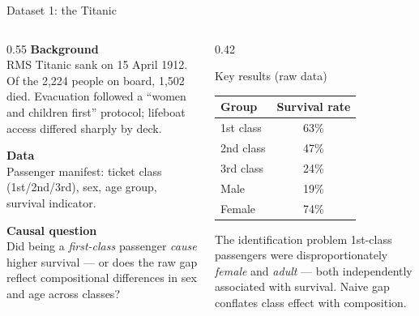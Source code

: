 \documentclass[aspectratio=169, 10pt]{beamer}
\begin{document}
\begin{frame}[shrink=8]{Dataset 1: the Titanic}

  \begin{columns}[T]
    \begin{column}{0.55\textwidth}
      \textbf{Background}\\[3pt]
      RMS Titanic sank on 15 April 1912. Of the 2{,}224 people on board, 1{,}502 died. Evacuation followed a ``women and children first'' protocol; lifeboat access differed sharply by deck.

      \smallskip
      \textbf{Data} \citep{Dawson1995}\\[3pt]
      Passenger manifest: ticket class (1st/2nd/3rd), sex, age group, survival indicator.

      \smallskip
      \textbf{Causal question}\\[3pt]
      Did being a \emph{first-class} passenger \emph{cause} higher survival --- or does the raw gap reflect compositional differences in sex and age across classes?
    \end{column}
    \begin{column}{0.42\textwidth}
      \begin{block}{Key results (raw data)}
        \begin{tabular}{lc}
          \toprule
          Group & Survival rate \\
          \midrule
          1st class & 63\% \\
          2nd class & 47\% \\
          3rd class & 24\% \\
          \midrule
          Male   & 19\% \\
          Female & 74\% \\
          \bottomrule
        \end{tabular}
      \end{block}
      \smallskip
      \begin{alertblock}{The identification problem}
        1st-class passengers were disproportionately \emph{female} and \emph{adult} — both independently associated with survival. Naive gap conflates class effect with composition.
      \end{alertblock}
    \end{column}
  \end{columns}

\end{frame}
\end{document}

